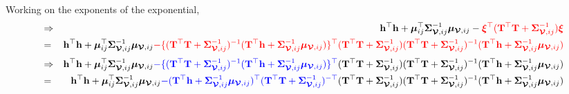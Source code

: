 \documentclass[12pt]{article}
\newcommand{\0}{\mathbf{0}}
\begin{document}
Working on the exponents of the exponential,
\begin{eqnarray*}
& \Rightarrow & \mathbf{h}^{\top} \mathbf{h} + \boldsymbol{\mu}_{ij}^{\top} \boldsymbol{\Sigma}_{\boldsymbol{\mathcal{V}}, ij}^{-1} \boldsymbol{\mu}_{\boldsymbol{\mathcal{V}}, ij}  - \textcolor{red}{ \boldsymbol{\xi}^{\top} ( \mathbf{T}^{\top} \mathbf{T} + \boldsymbol{\Sigma}_{\boldsymbol{\mathcal{V}}, ij}^{-1} ) \boldsymbol{\xi}} \\
& = & \mathbf{h}^{\top} \mathbf{h} + \boldsymbol{\mu}_{ij}^{\top} \boldsymbol{\Sigma}_{\boldsymbol{\mathcal{V}}, ij}^{-1} \boldsymbol{\mu}_{\boldsymbol{\mathcal{V}}, ij} \textcolor{red}{  - \{ ( \mathbf{T}^{\top} \mathbf{T} + \boldsymbol{\Sigma}_{\boldsymbol{\mathcal{V}}, ij}^{-1} )^{-1} ( \mathbf{T}^{\top} \mathbf{h} + \boldsymbol{\Sigma}_{\boldsymbol{\mathcal{V}}, ij}^{-1}\boldsymbol{\mu}_{\boldsymbol{\mathcal{V}}, ij} ) \}^{\top}} \textcolor{red}{ ( \mathbf{T}^{\top} \mathbf{T} + \boldsymbol{\Sigma}_{\boldsymbol{\mathcal{V}}, ij}^{-1} ) ( \mathbf{T}^{\top} \mathbf{T} + \boldsymbol{\Sigma}_{\boldsymbol{\mathcal{V}}, ij}^{-1} )^{-1} ( \mathbf{T}^{\top} \mathbf{h} + \boldsymbol{\Sigma}_{\boldsymbol{\mathcal{V}}, ij}^{-1}\boldsymbol{\mu}_{\boldsymbol{\mathcal{V}}, ij} )} 
\end{eqnarray*}
\begin{eqnarray*}
& \Rightarrow & \mathbf{h}^{\top} \mathbf{h} + \boldsymbol{\mu}_{ij}^{\top} \boldsymbol{\Sigma}_{\boldsymbol{\mathcal{V}}, ij}^{-1} \boldsymbol{\mu}_{\boldsymbol{\mathcal{V}}, ij} \textcolor{blue}{  - \{ ( \mathbf{T}^{\top} \mathbf{T} + \boldsymbol{\Sigma}_{\boldsymbol{\mathcal{V}}, ij}^{-1} )^{-1} ( \mathbf{T}^{\top} \mathbf{h} + \boldsymbol{\Sigma}_{\boldsymbol{\mathcal{V}}, ij}^{-1}\boldsymbol{\mu}_{\boldsymbol{\mathcal{V}}, ij} ) \}^{\top}} ( \mathbf{T}^{\top} \mathbf{T} + \boldsymbol{\Sigma}_{\boldsymbol{\mathcal{V}}, ij}^{-1} ) ( \mathbf{T}^{\top} \mathbf{T} + \boldsymbol{\Sigma}_{\boldsymbol{\mathcal{V}}, ij}^{-1} )^{-1} ( \mathbf{T}^{\top} \mathbf{h} + \boldsymbol{\Sigma}_{\boldsymbol{\mathcal{V}}, ij}^{-1}\boldsymbol{\mu}_{\boldsymbol{\mathcal{V}}, ij} ) \\
& = & \mathbf{h}^{\top} \mathbf{h} + \boldsymbol{\mu}_{ij}^{\top} \boldsymbol{\Sigma}_{\boldsymbol{\mathcal{V}}, ij}^{-1} \boldsymbol{\mu}_{\boldsymbol{\mathcal{V}}, ij} \textcolor{blue}{ - ( \mathbf{T}^{\top} \mathbf{h} + \boldsymbol{\Sigma}_{\boldsymbol{\mathcal{V}}, ij}^{-1}\boldsymbol{\mu}_{\boldsymbol{\mathcal{V}}, ij} )^{\top} ( \mathbf{T}^{\top} \mathbf{T} + \boldsymbol{\Sigma}_{\boldsymbol{\mathcal{V}}, ij}^{-1} )^{-\top}} ( \mathbf{T}^{\top} \mathbf{T} + \boldsymbol{\Sigma}_{\boldsymbol{\mathcal{V}}, ij}^{-1} ) ( \mathbf{T}^{\top} \mathbf{T} + \boldsymbol{\Sigma}_{\boldsymbol{\mathcal{V}}, ij}^{-1} )^{-1} ( \mathbf{T}^{\top} \mathbf{h} + \boldsymbol{\Sigma}_{\boldsymbol{\mathcal{V}}, ij}^{-1}\boldsymbol{\mu}_{\boldsymbol{\mathcal{V}}, ij} )
\end{eqnarray*}
\end{document}
